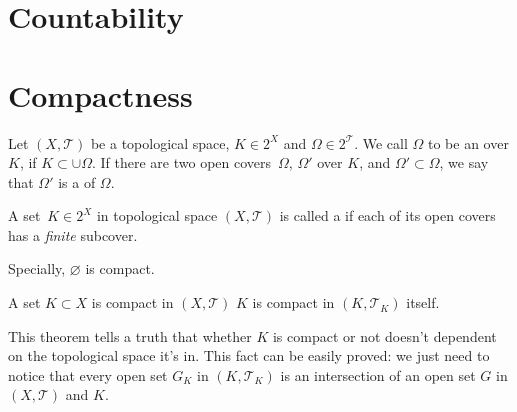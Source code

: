 \documentclass[openany]{book}
\begin{document}
\section{Countability}

\section{Compactness}

\begin{definition}\label{definition: open cover}
	Let $(X, \mathscr T)$ be a topological space, $K \in 2^X$ and $\varOmega \in 2^\mathscr T$. We call $\varOmega$ to be an  over $K$, if $K \subset \cup \varOmega$. 
	If there are two open covers~$\varOmega$, $\varOmega'$ over $K$, and $\varOmega' \subset \varOmega$, we say that $\varOmega'$ is a  of $\varOmega$.
\end{definition}

\begin{definition}\label{definition: compact set}
	A set~$K \in 2^X$ in topological space $(X, \mathscr T)$ is called a  if each of its open covers has a \emph{finite} subcover. 
\end{definition}

Specially, $\varnothing$ is compact.

\begin{theorem}\label{theorem: compact iff compact in subspace}
	A set $K \subset X$ is compact in $(X,\mathscr T)$  $K$ is compact in $(K, \mathscr T_K)$ itself. 
\end{theorem}

This theorem tells a truth that whether $K$ is compact or not doesn't dependent on the topological space it's in. 
This fact can be easily proved: we just need to notice that every open set $G_K$ in $(K, \mathscr T_K)$ is an intersection of an open set $G$ in $(X, \mathscr T)$ and $K$. 
\end{document}
